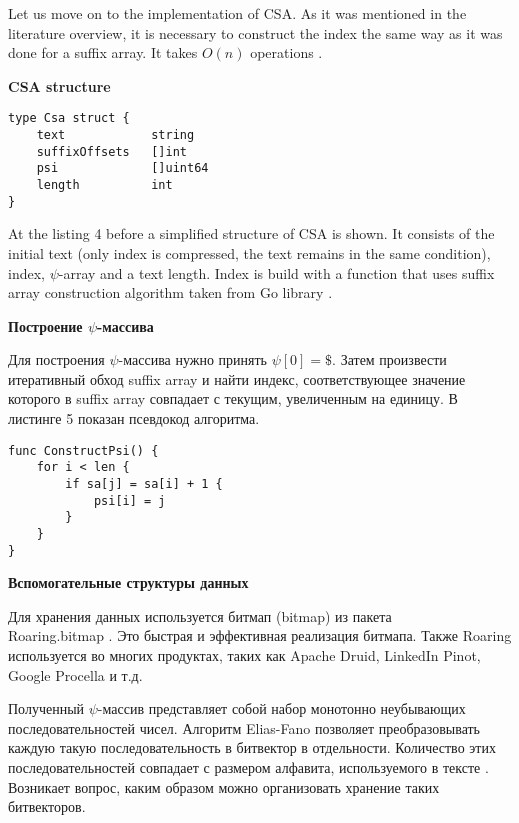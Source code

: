 
Let us move on to the implementation of CSA. As it was mentioned in the literature overview,
it is necessary to construct the index the same way as it was done for a suffix array.
It takes $O(n)$ operations \cite{huo2014practical}.

\textbf{CSA structure}

\begin{lstlisting}[caption=CSA structure]
type Csa struct {
	text            string
	suffixOffsets   []int
	psi             []uint64
	length          int
}
\end{lstlisting}

At the listing 4 before a simplified structure of CSA is shown. It consists of the initial text
(only index is compressed, the text remains in the same condition), index, $\psi$-array and a text length.
Index is build with a function that uses suffix array construction algorithm taken from Go library
\cite{golang2016sa}.

\textbf{Построение $\psi$-массива}

Для построения $\psi$-массива нужно принять $\psi[0] = \$$. Затем произвести итеративный обход
suffix array и найти индекс, соответствующее значение которого в suffix array совпадает с текущим,
увеличенным на единицу. В листинге 5 показан псевдокод алгоритма.

\begin{lstlisting}[caption=Построение CSA]
func ConstructPsi() {
	for i < len {
		if sa[j] = sa[i] + 1 {
			psi[i] = j
		}
	}
}
\end{lstlisting}

\textbf{Вспомогательные структуры данных}

Для хранения данных используется битмап (bitmap) из пакета\\ Roaring.bitmap \cite{chambi2016better}.
Это быстрая и эффективная реализация битмапа. Также Roaring используется во многих продуктах,
таких как Apache Druid, LinkedIn Pinot, Google Procella и т.д.

Полученный $\psi$-массив представляет собой набор монотонно неубывающих последовательностей чисел.
Алгоритм Elias-Fano позволяет преобразовывать каждую такую последовательность в битвектор в отдельности.
Количество этих последовательностей совпадает с размером алфавита, используемого в тексте \cite{andersensimple}.
Возникает вопрос, каким образом можно организовать хранение таких битвекторов.

